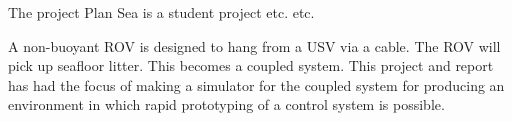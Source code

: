 The project Plan Sea is a student project etc. etc.

A non-buoyant ROV is designed to hang from a USV via a cable. The ROV will pick up seafloor litter. This becomes a coupled system. This project and report has had the focus of making a simulator for the coupled system for producing an environment in which rapid prototyping of a control system is possible. 










